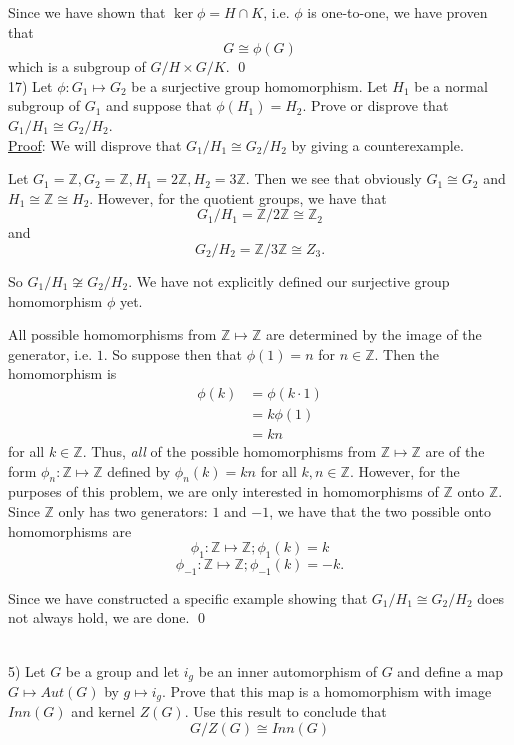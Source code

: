 \documentclass{article}
\begin{document}
Since we have shown that $\ker \phi = H \cap K$, i.e. $\phi$ is one-to-one, we have proven that 
$$G \cong \phi(G)$$
which is a subgroup of $G/H \times G/K$. \qed \\

17) Let $\phi : G_1 \mapsto G_2$ be a surjective group homomorphism. Let $H_1$ be a normal subgroup of $G_1$ and suppose that $\phi(H_1) = H_2$. Prove or disprove that $G_1/H_1 \cong G_2/H_2$. \\

\underline{Proof}: We will disprove that $G_1/H_1 \cong G_2/H_2$ by giving a counterexample.

Let $G_1 = \mathbb{Z}, G_2 = \mathbb{Z}, H_1 = 2\mathbb{Z}, H_2 = 3\mathbb{Z}$. Then we see that obviously $G_1 \cong G_2$ and $H_1 \cong \mathbb{Z} \cong H_2$. However, for the quotient groups, we have that 
$$G_1 / H_1 = \mathbb{Z} / 2\mathbb{Z} \cong \mathbb{Z}_2$$
and
$$G_2 / H_2 = \mathbb{Z} / 3\mathbb{Z} \cong Z_3.$$

So $G_1 / H_1 \not \cong G_2 / H_2$. We have not explicitly defined our surjective group homomorphism $\phi$ yet. 

All possible homomorphisms from $\mathbb{Z} \mapsto \mathbb{Z}$ are determined by the image of the generator, i.e. $1$. So suppose then that $\phi(1) = n$ for $n \in \mathbb{Z}$. Then the homomorphism is
\begin{align*}
	\phi(k) &= \phi(k \cdot 1) \\
	&= k \phi(1) \\
	&= kn
\end{align*}
for all $k \in \mathbb{Z}$. Thus, \textit{all} of the possible homomorphisms from $\mathbb{Z} \mapsto \mathbb{Z}$ are of the form $\phi_n : \mathbb{Z} \mapsto \mathbb{Z}$ defined by $\phi_n(k) = kn$ for all $k, n \in \mathbb{Z}$. However, for the purposes of this problem, we are only interested in homomorphisms of $\mathbb{Z}$ onto $\mathbb{Z}$. Since $\mathbb{Z}$ only has two generators: $1$ and $-1$, we have that the two possible onto homomorphisms are
$$\phi_1 : \mathbb{Z} \mapsto \mathbb{Z}; \phi_1(k) = k$$
$$\phi_{-1} : \mathbb{Z} \mapsto \mathbb{Z}; \phi_{-1}(k) = -k.$$ 

Since we have constructed a specific example showing that $G_1/H_1 \cong G_2/H_2$ does not always hold, we are done. \qed \\\

5) Let $G$ be a group and let $i_g$ be an inner automorphism of $G$ and define a map $G \mapsto Aut(G)$ by $g \mapsto i_g$. Prove that this map is a homomorphism with image $Inn(G)$ and kernel $Z(G)$. Use this result to conclude that 
$$G/Z(G) \cong Inn(G)$$
\end{document}

